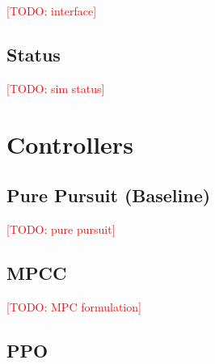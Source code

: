 \documentclass[12pt]{article}
\newcommand{\todo}[1]{\textcolor{red}{[TODO: #1]}}
\begin{document}
\todo{interface}

\subsection{Status}

\todo{sim status}

\section{Controllers}
\subsection{Pure Pursuit (Baseline)}

\todo{pure pursuit}

\subsection{MPCC}

\todo{MPC formulation}

\subsection{PPO}
\end{document}
